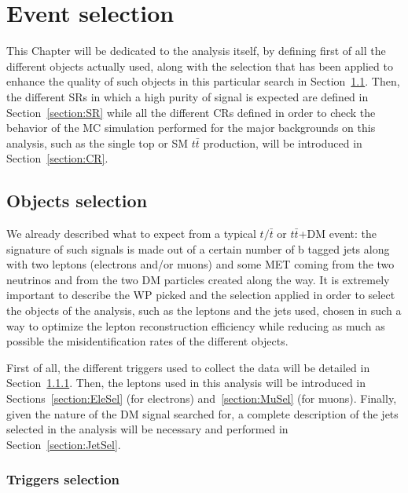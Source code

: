 \documentclass[a4paper, 10pt, openright]{report}
\begin{document}
\chapter{Event selection} \label{chapter:Selection}

This Chapter will be dedicated to the analysis itself, by defining first of all the different objects actually used, along with the selection that has been applied to enhance the quality of such objects in this particular search in Section~\ref{section:Selection}. Then, the different \acfp{SR} in which a high purity of signal is expected are defined in Section~\ref{section:SR} while all the different \acfp{CR} defined in order to check the behavior of the \ac{MC} simulation performed for the major backgrounds on this analysis, such as the single top or \ac{SM} $t \bar t$ production, will be introduced in Section~\ref{section:CR}. 

\section{Objects selection} \label{section:Selection}

We already described what to expect from a typical $t/\bar t$ or $t \bar t$+DM event: the signature of such signals is made out of a certain number of b tagged jets along with two leptons (electrons and/or muons) and some \ac{MET} coming from the two neutrinos and from the two \ac{DM} particles created along the way. It is extremely important to describe the \acf{WP} picked and the selection applied in order to select the objects of the analysis, such as the leptons and the jets used, chosen in such a way to optimize the lepton reconstruction efficiency while reducing as much as possible the misidentification rates of the different objects.

First of all, the different triggers used to collect the data will be detailed in Section~\ref{section:Triggers}. Then, the leptons used in this analysis will be introduced in Sections~\ref{section:EleSel} (for electrons) and~\ref{section:MuSel} (for muons). Finally, given the nature of the \ac{DM} signal searched for, a complete description of the jets selected in the analysis will be necessary and performed in Section~\ref{section:JetSel}.

\subsection{Triggers selection} \label{section:Triggers}
\end{document}
